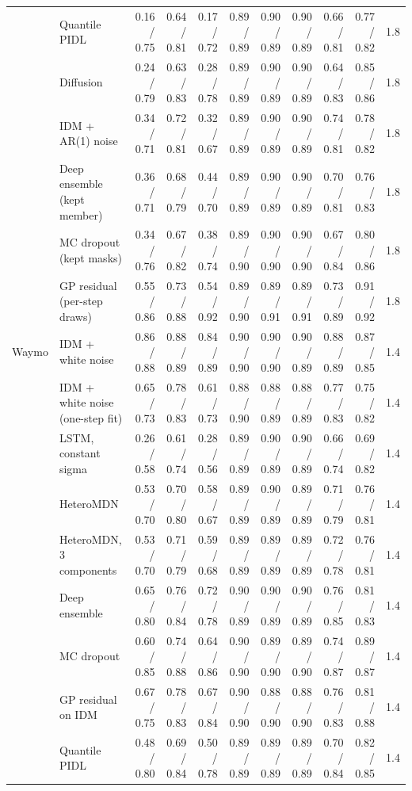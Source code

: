 \begin{longtable}{llrrrrrrrrr}
 & Quantile PIDL & 0.16 / 0.75 & 0.64 / 0.81 & 0.17 / 0.72 & 0.89 / 0.89 & 0.90 / 0.89 & 0.90 / 0.89 & 0.66 / 0.81 & 0.77 / 0.82 & 1.8 \\
 & Diffusion & 0.24 / 0.79 & 0.63 / 0.83 & 0.28 / 0.78 & 0.89 / 0.89 & 0.90 / 0.89 & 0.90 / 0.89 & 0.64 / 0.83 & 0.85 / 0.86 & 1.8 \\
 & IDM + AR(1) noise & 0.34 / 0.71 & 0.72 / 0.81 & 0.32 / 0.67 & 0.89 / 0.89 & 0.90 / 0.89 & 0.90 / 0.89 & 0.74 / 0.81 & 0.78 / 0.82 & 1.8 \\
 & Deep ensemble (kept member) & 0.36 / 0.71 & 0.68 / 0.79 & 0.44 / 0.70 & 0.89 / 0.89 & 0.90 / 0.89 & 0.90 / 0.89 & 0.70 / 0.81 & 0.76 / 0.83 & 1.8 \\
 & MC dropout (kept masks) & 0.34 / 0.76 & 0.67 / 0.82 & 0.38 / 0.74 & 0.89 / 0.90 & 0.90 / 0.90 & 0.90 / 0.90 & 0.67 / 0.84 & 0.80 / 0.86 & 1.8 \\
 & GP residual (per-step draws) & 0.55 / 0.86 & 0.73 / 0.88 & 0.54 / 0.92 & 0.89 / 0.90 & 0.89 / 0.91 & 0.89 / 0.91 & 0.73 / 0.89 & 0.91 / 0.92 & 1.8 \\
\midrule
Waymo & IDM + white noise & 0.86 / 0.88 & 0.88 / 0.89 & 0.84 / 0.89 & 0.90 / 0.90 & 0.90 / 0.90 & 0.90 / 0.89 & 0.88 / 0.89 & 0.87 / 0.85 & 1.4 \\
 & IDM + white noise (one-step fit) & 0.65 / 0.73 & 0.78 / 0.83 & 0.61 / 0.73 & 0.88 / 0.90 & 0.88 / 0.89 & 0.88 / 0.89 & 0.77 / 0.83 & 0.75 / 0.82 & 1.4 \\
 & LSTM, constant sigma & 0.26 / 0.58 & 0.61 / 0.74 & 0.28 / 0.56 & 0.89 / 0.89 & 0.90 / 0.89 & 0.90 / 0.89 & 0.66 / 0.74 & 0.69 / 0.82 & 1.4 \\
 & HeteroMDN & 0.53 / 0.70 & 0.70 / 0.80 & 0.58 / 0.67 & 0.89 / 0.89 & 0.90 / 0.89 & 0.89 / 0.89 & 0.71 / 0.79 & 0.76 / 0.81 & 1.4 \\
 & HeteroMDN, 3 components & 0.53 / 0.70 & 0.71 / 0.79 & 0.59 / 0.68 & 0.89 / 0.89 & 0.89 / 0.89 & 0.89 / 0.89 & 0.72 / 0.78 & 0.76 / 0.81 & 1.4 \\
 & Deep ensemble & 0.65 / 0.80 & 0.76 / 0.84 & 0.72 / 0.78 & 0.90 / 0.89 & 0.90 / 0.89 & 0.90 / 0.89 & 0.76 / 0.85 & 0.81 / 0.83 & 1.4 \\
 & MC dropout & 0.60 / 0.85 & 0.74 / 0.88 & 0.64 / 0.86 & 0.90 / 0.90 & 0.89 / 0.90 & 0.89 / 0.90 & 0.74 / 0.87 & 0.89 / 0.87 & 1.4 \\
 & GP residual on IDM & 0.67 / 0.75 & 0.78 / 0.83 & 0.67 / 0.84 & 0.90 / 0.90 & 0.88 / 0.90 & 0.88 / 0.90 & 0.76 / 0.83 & 0.81 / 0.88 & 1.4 \\
 & Quantile PIDL & 0.48 / 0.80 & 0.69 / 0.84 & 0.50 / 0.78 & 0.89 / 0.89 & 0.89 / 0.89 & 0.89 / 0.89 & 0.70 / 0.84 & 0.82 / 0.85 & 1.4 \\

\end{longtable}
